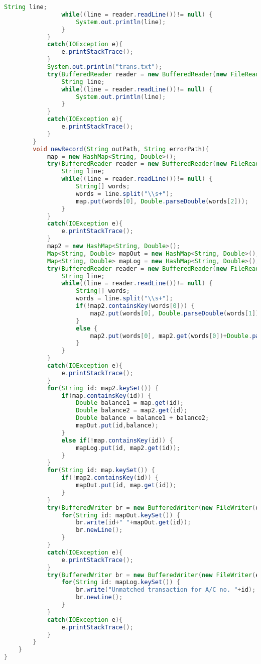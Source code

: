 \documentclass{article}
\begin{document}
\begin{lstlisting}[language=Java, caption=Cosine Similarity Implementation]
				String line;
				while((line = reader.readLine())!= null) {
					System.out.println(line);
				}
			}
			catch(IOException e){
				e.printStackTrace();
			}
			System.out.println("trans.txt");
			try(BufferedReader reader = new BufferedReader(new FileReader(filePath2))){
				String line;
				while((line = reader.readLine())!= null) {
					System.out.println(line);
				}
			}
			catch(IOException e){
				e.printStackTrace();
			}
		}
		void newRecord(String outPath, String errorPath){
			map = new HashMap<String, Double>();
			try(BufferedReader reader = new BufferedReader(new FileReader(filePath1))){
				String line;
				while((line = reader.readLine())!= null) {
					String[] words;
					words = line.split("\\s+");
					map.put(words[0], Double.parseDouble(words[2]));	
				}
			}
			catch(IOException e){
				e.printStackTrace();
			}
			map2 = new HashMap<String, Double>();
			Map<String, Double> mapOut = new HashMap<String, Double>();
			Map<String, Double> mapLog = new HashMap<String, Double>();
			try(BufferedReader reader = new BufferedReader(new FileReader(filePath2))){
				String line;
				while((line = reader.readLine())!= null) {
					String[] words;
					words = line.split("\\s+");
					if(!map2.containsKey(words[0])) {
						map2.put(words[0], Double.parseDouble(words[1]));
					}
					else {
						map2.put(words[0], map2.get(words[0])+Double.parseDouble(words[1]));
					}
				}
			}
			catch(IOException e){
				e.printStackTrace();
			}
			for(String id: map2.keySet()) {
				if(map.containsKey(id)) {
					Double balance1 = map.get(id);
					Double balance2 = map2.get(id);
					Double balance = balance1 + balance2;
					mapOut.put(id,balance);
				}
				else if(!map.containsKey(id)) {
					mapLog.put(id, map2.get(id));
				}
			}
			for(String id: map.keySet()) {
				if(!map2.containsKey(id)) {
					mapOut.put(id, map.get(id));
				}
			}
			try(BufferedWriter br = new BufferedWriter(new FileWriter(outPath))){
				for(String id: mapOut.keySet()) {
					br.write(id+" "+mapOut.get(id));
					br.newLine();
				}
			}
			catch(IOException e){
				e.printStackTrace();
			}
			try(BufferedWriter br = new BufferedWriter(new FileWriter(errorPath))){
				for(String id: mapLog.keySet()) {
					br.write("Unmatched transaction for A/C no. "+id);
					br.newLine();
				}
			}
			catch(IOException e){
				e.printStackTrace();
			}
		}
	}
}
\end{lstlisting}
\end{document}
